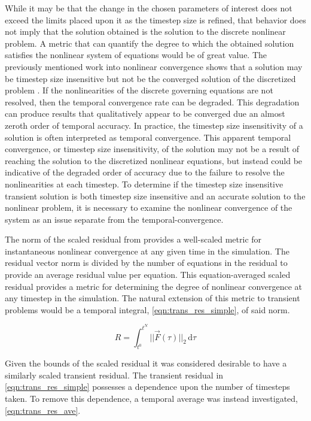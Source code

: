 While it may be that the change in the chosen parameters of interest does not exceed the limits placed upon it as the timestep size is refined, that behavior does not imply that the solution obtained is the solution to the discrete nonlinear problem.
A metric that can quantify the degree to which the obtained solution satisfies the nonlinear system of equations would be of great value.
The previously mentioned work into nonlinear convergence shows that a solution may be timestep size insensitive but not be the converged solution of the discretized problem \cite{Knoll2001}.
If the nonlinearities of the discrete governing equations are not resolved, then the temporal convergence rate can be degraded.
This degradation can produce results that qualitatively appear to be converged due an almost zeroth order of temporal accuracy.
In practice, the timestep size insensitivity of a solution is often interpreted as temporal convergence.
This apparent temporal convergence, or timestep size insensitivity, of the solution may not be a result of reaching the solution to the discretized nonlinear equations, but instead could be indicative of the degraded order of accuracy due to the failure to resolve the nonlinearities at each timestep.
To determine if the timestep size insensitive transient solution is both timestep size insensitive and an accurate solution to the nonlinear problem, it is necessary to examine the nonlinear convergence of the system as an issue separate from the temporal-convergence.

The norm of the scaled residual from  provides a well-scaled metric for instantaneous nonlinear convergence at any given time in the simulation.
The residual vector norm is divided by the number of equations in the residual to provide an average residual value per equation.
This equation-averaged scaled residual provides a metric for determining the degree of nonlinear convergence at any timestep in the simulation.
The natural extension of this metric to transient problems would be a temporal integral, \eqref{eqn:trans_res_simple}, of said norm.

\begin{equation}
\label{eqn:trans_res_simple}
R = \int_{t^{0}}^{t^{N}} ||\vec{F}(\tau)||_2 \,\mathrm{d} \tau
\end{equation}

Given the bounds of the scaled residual it was considered desirable to have a similarly scaled transient residual.
The transient residual in \eqref{eqn:trans_res_simple} possesses a dependence upon the number of timesteps taken.
To remove this dependence, a temporal average was instead investigated, \eqref{eqn:trans_res_ave}.

